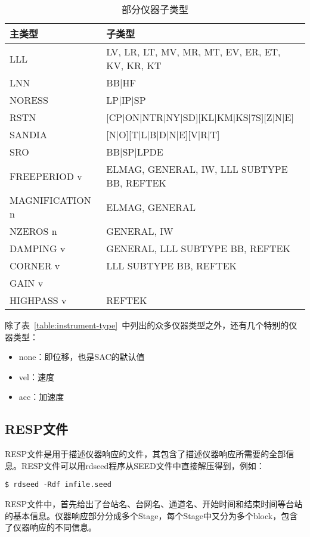 \begin{table}[htb]
\centering
\ttfamily
\small
\caption{部分仪器子类型}
\label{table:instrument-subtype}
\begin{tabular}{ll}
\toprule
主类型 &   子类型 \\
\midrule
LLL       &       LV, LR, LT, MV, MR, MT, EV, ER, ET, KV, KR, KT    \\
LNN       &       BB|HF                                 \\
NORESS    &       LP|IP|SP                              \\
RSTN      &       [CP|ON|NTR|NY|SD][KL|KM|KS|7S][Z|N|E] \\
SANDIA    &       [N|O][T|L|B|D|N|E][V|R|T]             \\
SRO       &       BB|SP|LPDE                            \\
FREEPERIOD v &    ELMAG, GENERAL, IW, LLL SUBTYPE BB, REFTEK    \\
MAGNIFICATION n & ELMAG, GENERAL  \\
NZEROS n &        GENERAL, IW   \\
DAMPING v &       GENERAL, LLL SUBTYPE BB, REFTEK   \\
CORNER v &        LLL SUBTYPE BB, REFTEK    \\
GAIN v &            \\
HIGHPASS v &      REFTEK    \\
\bottomrule
\end{tabular}
\end{table}

除了表~\ref{table:instrument-type}~中列出的众多仪器类型之外，还有几个特别的仪器类型：
\begin{itemize}
\item none：即位移，也是SAC的默认值
\item vel：速度
\item acc：加速度
\end{itemize}

\subsection{RESP文件}
RESP文件是用于描述仪器响应的文件，其包含了描述仪器响应所需要的全部信息。RESP文件可以用rdseed程序从SEED文件中直接解压得到，例如：
\begin{verbatim}
$ rdseed -Rdf infile.seed
\end{verbatim}

RESP文件中，首先给出了台站名、台网名、通道名、开始时间和结束时间等台站的基本信息。仪器响应部分分成多个Stage，每个Stage中又分为多个block，包含了仪器响应的不同信息。

